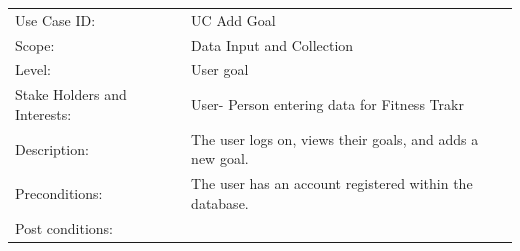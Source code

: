 \documentclass[10pt]{article}
\begin{document}
\begin{longtable}[]{@{}ll@{}}
\toprule
\begin{minipage}[t]{0.47\columnwidth}\raggedright\strut
Use Case ID:\strut
\end{minipage} & \begin{minipage}[t]{0.47\columnwidth}\raggedright\strut
UC Add Goal\strut
\end{minipage}\tabularnewline
\begin{minipage}[t]{0.47\columnwidth}\raggedright\strut
Scope:\strut
\end{minipage} & \begin{minipage}[t]{0.47\columnwidth}\raggedright\strut
Data Input and Collection\strut
\end{minipage}\tabularnewline
\begin{minipage}[t]{0.47\columnwidth}\raggedright\strut
Level:\strut
\end{minipage} & \begin{minipage}[t]{0.47\columnwidth}\raggedright\strut
User goal\strut
\end{minipage}\tabularnewline
\begin{minipage}[t]{0.47\columnwidth}\raggedright\strut
Stake Holders and Interests:\strut
\end{minipage} & \begin{minipage}[t]{0.47\columnwidth}\raggedright\strut
User- Person entering data for Fitness Trakr\strut
\end{minipage}\tabularnewline
\begin{minipage}[t]{0.47\columnwidth}\raggedright\strut
Description:\strut
\end{minipage} & \begin{minipage}[t]{0.47\columnwidth}\raggedright\strut
The user logs on, views their goals, and adds a new goal.\strut
\end{minipage}\tabularnewline
\begin{minipage}[t]{0.47\columnwidth}\raggedright\strut
Preconditions:\strut
\end{minipage} & \begin{minipage}[t]{0.47\columnwidth}\raggedright\strut
The user has an account registered within the database.\strut
\end{minipage}\tabularnewline
\begin{minipage}[t]{0.47\columnwidth}\raggedright\strut
Post conditions:\strut
\end{minipage} & \begin{minipage}[t]{0.47\columnwidth}\raggedright\strut

\end{minipage}
\end{longtable}
\end{document}

